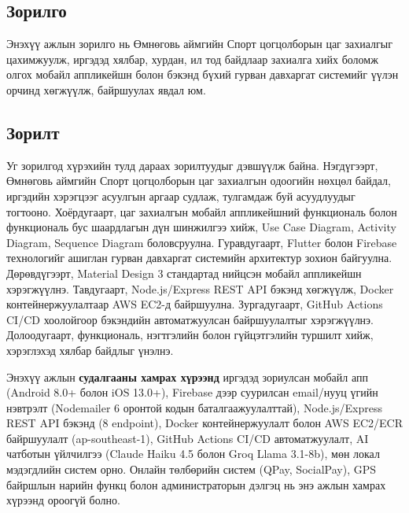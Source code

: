 \subsection*{Зорилго}

Энэхүү ажлын зорилго нь Өмнөговь аймгийн Спорт цогцолборын цаг захиалгыг цахимжуулж, иргэдэд хялбар, хурдан, ил тод байдлаар захиалга хийх боломж олгох  мобайл аппликейшн болон  бэкэнд бүхий гурван давхаргат системийг үүлэн орчинд хөгжүүлж, байршуулах явдал юм.


\subsection*{Зорилт}

Уг зорилгод хүрэхийн тулд дараах зорилтуудыг дэвшүүлж байна. Нэгдүгээрт, Өмнөговь аймгийн Спорт цогцолборын цаг захиалгын одоогийн нөхцөл байдал, иргэдийн хэрэгцээг асуулгын аргаар судлаж, тулгамдаж буй асуудлуудыг тогтооно. Хоёрдугаарт, цаг захиалгын мобайл аппликейшний функциональ болон функциональ бус шаардлагын дүн шинжилгээ хийж, Use Case Diagram, Activity Diagram, Sequence Diagram боловсруулна. Гуравдугаарт, Flutter болон Firebase технологийг ашиглан гурван давхаргат системийн архитектур зохион байгуулна. Дөрөвдүгээрт, Material Design 3 стандартад нийцсэн мобайл аппликейшн хэрэгжүүлнэ. Тавдугаарт, Node.js/Express REST API бэкэнд хөгжүүлж, Docker контейнержуулалтаар AWS EC2-д байршуулна. Зургадугаарт, GitHub Actions CI/CD хоолойгоор бэкэндийн автоматжуулсан байршуулалтыг хэрэгжүүлнэ. Долоодугаарт, функциональ, нэгтгэлийн болон гүйцэтгэлийн туршилт хийж, хэрэглэхэд хялбар байдлыг үнэлнэ.

Энэхүү ажлын \textbf{судалгааны хамрах хүрээнд} иргэдэд зориулсан мобайл апп (Android 8.0+ болон iOS 13.0+), Firebase дээр суурилсан email/нууц үгийн нэвтрэлт (Nodemailer 6 оронтой кодын баталгаажуулалттай), Node.js/Express REST API бэкэнд (8 endpoint), Docker контейнержуулалт болон AWS EC2/ECR байршуулалт (ap-southeast-1), GitHub Actions CI/CD автоматжуулалт, AI чатботын үйлчилгээ (Claude Haiku 4.5 болон Groq Llama 3.1-8b), мөн локал мэдэгдлийн систем орно. Онлайн төлбөрийн систем (QPay, SocialPay), GPS байршлын нарийн функц болон администраторын дэлгэц нь энэ ажлын хамрах хүрээнд ороогүй болно.


